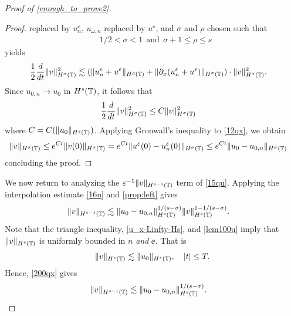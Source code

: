 \begin{proof}[Proof of \eqref{enough_to_prove2}]
\begin{proof}
replaced by $u^\ee_n$, $u_{\omega,n}$ replaced by $u^\ee$, and $\sigma$ and 
$\rho$ chosen such that
%
%
\begin{equation}
\label{size_of_sigma'}
\begin{split}
	& 1/2 < \sigma < 1 \ \ \text{and} \ \  \sigma + 1 \le \rho \le s
\end{split}
\end{equation}
%
%
yields
%
%
\begin{equation*}
\begin{split}
\frac{1}{2}\frac{d}{dt} \|v\|_{H^\sigma(\mathbb{T})}^2
& \lesssim
(\|u^{\varepsilon}_n + u^\varepsilon \|_{H^{\rho}(\mathbb{T})} +
\|\partial_x(u^{\varepsilon}_n + u^\varepsilon) \|_{H^\sigma(\mathbb{T})})
\cdot \|v\|_{H^\sigma(\mathbb{T})}^2.
\end{split}
\end{equation*}
%
%
Since $u_{0,n} \to u_{0}$ in $H^s(\mathbb{T})$, it follows that 
%
\begin{equation}
\begin{split}
\label{12qx}
\frac{1}{2}\frac{d}{dt} \|v\|_{H^{\sigma}(\mathbb{T})}^2
& \le
C \|v\|_{H^{\sigma}(\mathbb{T})}^2
\end{split}
\end{equation}
%
%
where $C = C(\|u_0\|_{H^s(\mathbb{T})})$. 
Applying Gronwall's inequality to \eqref{12qx}, we obtain
%
%
\begin{equation*}
\begin{split}
\|v\|_{H^{\sigma}(\mathbb{T})}
& \le e^{C t}\|v(0)\|_{H^{\sigma}(\mathbb{T})}
= e^{C t}\|u^\varepsilon(0) - u^\varepsilon_n(0) \|_{H^{\sigma}(\mathbb{T})} \le e^{C t} \|u_0 - 
u_{0,n}\|_{H^\sigma(\mathbb{T})}
\end{split}
\end{equation*}
%
%
concluding the proof. 
\end{proof}
%
%
%

We now return to analyzing the $\varepsilon^{-1}
\|v\|_{H^{s-1}(\mathbb{T})}$ term of \eqref{15qu}.
Applying the 
interpolation estimate \eqref{16u} and
\cref{prop:left} gives
%
%
%
%
\begin{equation}
\begin{split}
\label{200qx}
\|v\|_{H^{s-1}(\mathbb{T})} 
& \lesssim  
\|u_0-u_{0,n}\|_{H^s(\mathbb{T})}^{1/(s-\sigma)}\|v\|_{H^s(\mathbb{T})}^{1- 
1/(s-\sigma)}.
\end{split}
\end{equation}
%
%
%
Note that the triangle inequality, \eqref{u_x-Linfty-Hs},
and \eqref{lem100u} 
imply that $\|v\|_{H^s(\mathbb{T})}$ is uniformly bounded in $n$ \emph{and} $\ee$. 
That is
%
%
\begin{equation*}
\begin{split}
	\|v\|_{H^s(\mathbb{T})} \lesssim \|u_0 \|_{H^s(\mathbb{T})}, \quad |t| \le T.
\label{growth_v}
\end{split}
\end{equation*}
%
%
Hence, \eqref{200qx} gives
%
%
\begin{equation}
\begin{split}
\label{200qxr}
\|v\|_{H^{s-1}(\mathbb{T})} 
& \lesssim  
\|u_0-u_{0,n}\|_{H^s(\mathbb{T})}^{1/(s-\sigma)}.
\end{split}
\end{equation}


\end{proof}
